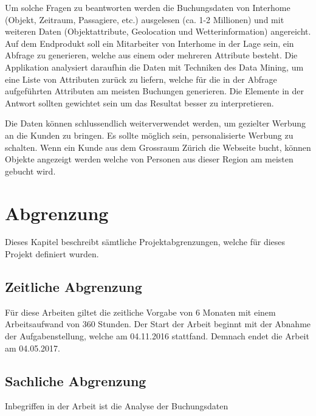 Um solche Fragen zu beantworten werden die Buchungsdaten von Interhome (Objekt, Zeitraum, Passagiere, etc.) ausgelesen (ca. 1-2 Millionen) und mit weiteren Daten (Objektattribute, Geolocation und Wetterinformation) angereicht. 
Auf dem Endprodukt soll ein Mitarbeiter von Interhome in der Lage sein, ein Abfrage zu generieren, welche aus einem oder mehreren Attribute besteht. Die Applikation analysiert daraufhin die Daten mit Techniken des Data Mining, um eine Liste von Attributen zurück zu liefern, welche für die in der Abfrage aufgeführten Attributen am meisten Buchungen generieren. Die Elemente in der Antwort sollten gewichtet sein um das Resultat besser zu interpretieren.

Die Daten können schlussendlich weiterverwendet werden, um gezielter Werbung an die Kunden zu bringen. Es sollte möglich sein, personalisierte Werbung zu schalten. Wenn ein Kunde aus dem Grossraum Zürich die Webseite bucht, können Objekte angezeigt werden welche von Personen aus dieser Region am meisten gebucht wird. 

\section{Abgrenzung}
Dieses Kapitel beschreibt sämtliche Projektabgrenzungen, welche für dieses Projekt definiert
wurden.

\subsection{Zeitliche Abgrenzung}
Für diese Arbeiten giltet die zeitliche Vorgabe von 6 Monaten mit einem Arbeitsaufwand von 360 Stunden.
Der Start der Arbeit beginnt mit der Abnahme der Aufgabenstellung, welche am 04.11.2016 stattfand.
Demnach endet die Arbeit am 04.05.2017.

\subsection{Sachliche Abgrenzung}
Inbegriffen in der Arbeit ist die Analyse der Buchungsdaten 